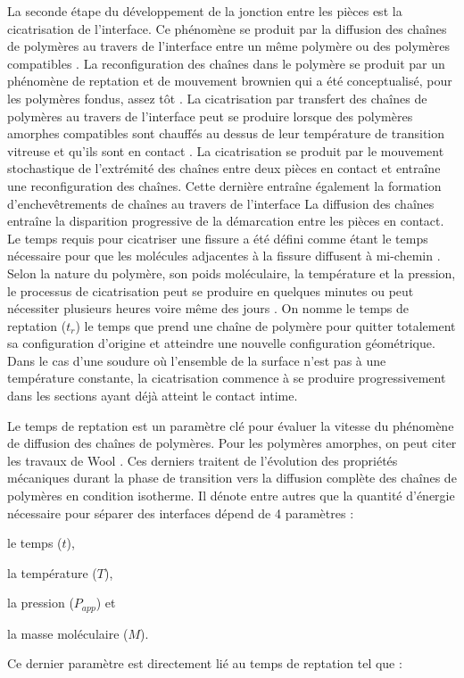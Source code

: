La seconde étape du développement de la jonction entre les pièces est la cicatrisation de l'interface. 
Ce phénomène se produit par la diffusion des chaînes de polymères au travers de l'interface entre un même polymère ou des polymères compatibles \cite{Jud1981b}. 
La reconfiguration des chaînes dans le polymère se produit par un phénomène de reptation et de mouvement brownien qui a été conceptualisé, pour les polymères fondus, assez tôt \cite{DeGennes1971,Edwards1978b,Klein1978,Daoud1979}. 
La cicatrisation par transfert des chaînes de polymères au travers de l'interface peut se produire lorsque des polymères amorphes compatibles sont chauffés au dessus de leur température de transition vitreuse et qu'ils sont en contact \cite{Jud1981a,Prager1981a}. 
La cicatrisation se produit par le mouvement stochastique de l'extrémité des chaînes entre deux pièces en contact et entraîne une reconfiguration des chaînes. 
Cette dernière entraîne également la formation d'enchevêtrements de chaînes au travers de l'interface \cite{Wool1983}
La diffusion des chaînes entraîne la disparition progressive de la démarcation entre les pièces en contact. 
Le temps requis pour cicatriser une fissure a été défini comme étant le temps nécessaire pour que les molécules adjacentes à la fissure diffusent à mi-chemin \cite{Prager1981a}.
Selon la nature du polymère, son poids moléculaire, la température et la pression, le processus de cicatrisation peut se produire en quelques minutes ou peut nécessiter plusieurs heures voire même des jours \cite{Prager1981a}. 
On nomme le temps de reptation ($t_r$) le temps que prend une chaîne de polymère pour quitter totalement sa configuration d'origine et atteindre une nouvelle configuration géométrique. 
Dans le cas d'une soudure où l'ensemble de la surface n'est pas à une température constante, la cicatrisation commence à se produire progressivement dans les sections ayant déjà atteint le contact intime. 

Le temps de reptation est un paramètre clé pour évaluer la vitesse du phénomène de diffusion des chaînes de polymères. 
Pour les polymères amorphes, on peut citer les travaux de Wool \cite{Wool1983,Wool1989}. 
Ces derniers traitent de l'évolution des propriétés mécaniques durant la phase de transition vers la diffusion complète des chaînes de polymères en condition isotherme. 
Il dénote entre autres que la quantité d'énergie nécessaire pour séparer des interfaces dépend de 4 paramètres : \begin{inparaenum}[(1)]
	\item le temps ($t$), 
	\item la température ($T$), 
	\item la pression ($P_{app}$) et
	\item la masse moléculaire ($M$). 
\end{inparaenum}
Ce dernier paramètre est directement lié au temps de reptation tel que \cite{DeGennes1971}: 

